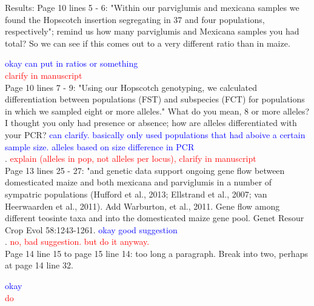 \documentclass[11pt]{article}
\newcommand{\res}[1]{\noindent \textcolor{blue}{{#1}} \\}
\newcommand{\jri}[1]{\noindent \textcolor{red}{{#1}} \\}
\begin{document}
Results:
Page 10 lines 5 - 6: "Within our parviglumis and mexicana samples we found the Hopscotch insertion segregating in 37 and four populations, respectively"; remind us how many parviglumis and Mexicana samples you had total? So we can see if this comes out to a very different ratio than in maize. 

\res{okay can put in ratios or something}
\jri{clarify in manuscript}

Page 10 lines 7 - 9: "Using our Hopscotch genotyping, we calculated diﬀerentiation between populations (FST) and subspecies (FCT) for populations in which we sampled eight or more alleles." What do you mean, 8 or more alleles? I thought you only had presence or absence; how are alleles differentiated with your PCR? \res{can clarify. basically only used populations that had aboive a certain sample size. alleles based on size difference in PCR}. 
\jri{explain (alleles in pop, not alleles per locus), clarify in manuscript}

Page 13 lines 25 - 27: "and genetic data support ongoing gene ﬂow between domesticated maize and both mexicana and parviglumis in a number of sympatric populations (Huﬀord et al., 2013; Ellstrand et al., 2007; van Heerwaarden et al., 2011). Add Warburton, et al., 2011.  Gene flow among different teosinte taxa and into the domesticated maize gene pool.  Genet Resour Crop Evol 58:1243-1261. \res{okay good suggestion}. 
\jri{no, bad suggestion. but do it anyway.}

Page 14 line 15 to page 15 line 14: too long a paragraph. Break into two, perhaps at page 14 line 32. 

\res{okay}
\jri{do}
\end{document}
